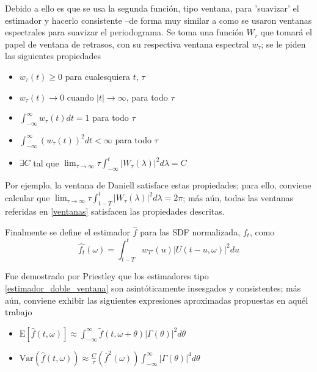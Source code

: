 \documentclass[12pt,a4paper]{mitthesis}
\newcommand{\intR}{\int_{-\infty}^{\infty}}
\newcommand{\est}[1]{\widehat{ #1 }}
\newcommand{\E}[1]{\mathrm{E}\left[ #1 \right]}
\newcommand{\Var}[1]{\mathrm{Var}\left( #1 \right)}
\newcommand{\abso}[1]{\left| #1 \right|}
\begin{document}
Debido a ello es que se usa la segunda funci\'on, tipo ventana, para 'suavizar' el estimador y 
hacerlo consistente --de forma muy similar a como se usaron ventanas espectrales para suavizar el 
periodograma.
Se toma una funci\'on $W_\tau$ que tomar\'a el papel de ventana de retrasos, con su respectiva 
ventana espectral $w_\tau$; se le piden las siguientes propiedades
\begin{itemize}
\item $w_{\tau}(t) \geq 0$ para cualesquiera $t$, $\tau$
\item $w_{\tau}(t) \rightarrow 0$ cuando $\lvert t \lvert \rightarrow \infty$, para todo $\tau$
\item $\displaystyle \int_{-\infty}^{\infty} w_{\tau}(t) dt = 1$ para todo $\tau$
\item $\displaystyle \int_{-\infty}^{\infty} \left( w_{\tau}(t) \right)^{2} dt < \infty$ para todo $\tau$
\item $\exists C$ tal que  
$\displaystyle \lim_{\tau\rightarrow\infty} \tau \int_{-\infty}^{t} \abso{ W_{\tau}(\lambda) }^{2} d\lambda = C$
\end{itemize}

Por ejemplo, la ventana de Daniell satisface estas propiedades; para ello, conviene calcular que
$\lim_{\tau\rightarrow\infty} \tau \int_{t-T}^{t} \lvert W_{\tau}(\lambda) \lvert^{2} d\lambda = 2\pi$;
m\'as a\'un, todas las ventanas referidas en \ref{ventanas} satisfacen las propiedades descritas.

Finalmente se define el estimador $\est{f}$ para las SDF normalizada, $f_t$, como
\begin{equation*}
\widehat{f_t}(\omega) = \int_{t-T}^{t} w_{T'}(u) \lvert U(t-u,\omega) \lvert^{2} du
\label{estimador_doble_ventana}
\end{equation*}

Fue demostrado por Priestley \cite{Priestley65} que los estimadores tipo 
\ref{estimador_doble_ventana} son asint\'oticamente insesgados y consistentes; m\'as a\'un, 
conviene exhibir las siguientes expresiones aproximadas propuestas en aqu\'el trabajo
\begin{itemize}
\item $\displaystyle
\E{\est{f}(t,\omega)} \approx 
\intR \widetilde{f}(t,\omega+\theta) \abso{\Gamma(\theta)}^{2} d\theta$
\item $\displaystyle
\Var{\est{f}(t,\omega)} \approx \frac{C}{\tau} \left( \overline{f}^{2}(\omega) \right)
\intR \abso{\Gamma(\theta)}^{4} d\theta $
\end{itemize}
\end{document}
